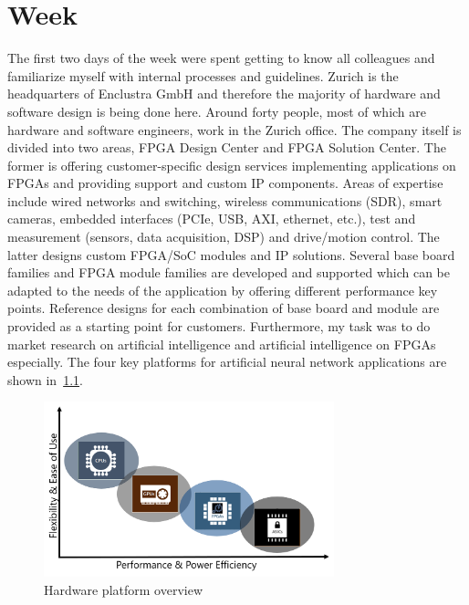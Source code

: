 \chapter{Week}
The first two days of the week were spent getting to know all colleagues and familiarize myself with internal processes and guidelines. Zurich is the headquarters of Enclustra GmbH and therefore the majority of hardware and software design is being done here. Around forty people, most of which are hardware and software engineers, work in the Zurich office. The company itself is divided into two areas, \ac{FPGA} Design Center and \ac{FPGA} Solution Center.
The former is offering customer-specific design services implementing applications on \acp{FPGA} and providing support and custom \ac{IP} components. Areas of expertise include wired networks and switching, wireless communications (\ac{SDR}), smart cameras, embedded interfaces (\ac{PCIe}, \ac{USB}, \ac{AXI}, ethernet, etc.), test and measurement (sensors, data acquisition, \ac{DSP}) and drive/motion control. 
The latter designs custom \ac{FPGA}/\ac{SoC} modules and \ac{IP} solutions. Several base board families and \ac{FPGA} module families are developed and supported which can be adapted to the needs of the application by offering different performance key points. Reference designs for each combination of base board and module are provided as a starting point for customers.
Furthermore, my task was to do market research on artificial intelligence and artificial intelligence on \acp{FPGA} especially. The four key platforms for artificial neural network applications are shown in~\ref{fig:overview}.
\begin{figure}[!htb]
	\centering
		\includegraphics[width=0.75\textwidth]{bilder/overview.png}
		\caption{Hardware platform overview}
		\label{fig:overview}
\end{figure}
